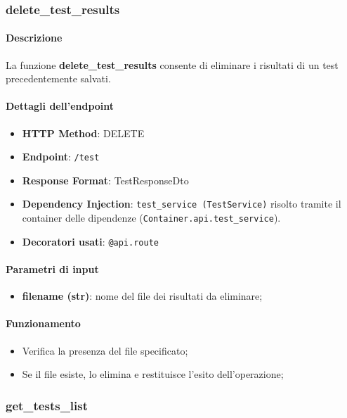 \subsubsection{delete\_test\_results}
\label{subsubsec:deletetestresults}

\paragraph{Descrizione}
La funzione \textbf{delete\_test\_results} consente di eliminare i risultati di un test precedentemente salvati.

\paragraph{Dettagli dell'endpoint}
\begin{itemize}
    \item \textbf{HTTP Method}: DELETE
    \item \textbf{Endpoint}: \texttt{/test}
    \item \textbf{Response Format}: TestResponseDto
    \item \textbf{Dependency Injection}: \texttt{test\_service (TestService)} risolto tramite il container delle dipendenze (\texttt{Container.api.test\_service}).
    \item \textbf{Decoratori usati}: \texttt{@api.route}
\end{itemize}

\paragraph{Parametri di input}
\begin{itemize}
    \item \textbf{filename (str)}: nome del file dei risultati da eliminare;
\end{itemize}

\paragraph{Funzionamento}
\begin{itemize}
    \item Verifica la presenza del file specificato;
    \item Se il file esiste, lo elimina e restituisce l'esito dell'operazione;
\end{itemize}

\subsubsection{get\_tests\_list}
\label{subsubsec:gettestslist}

